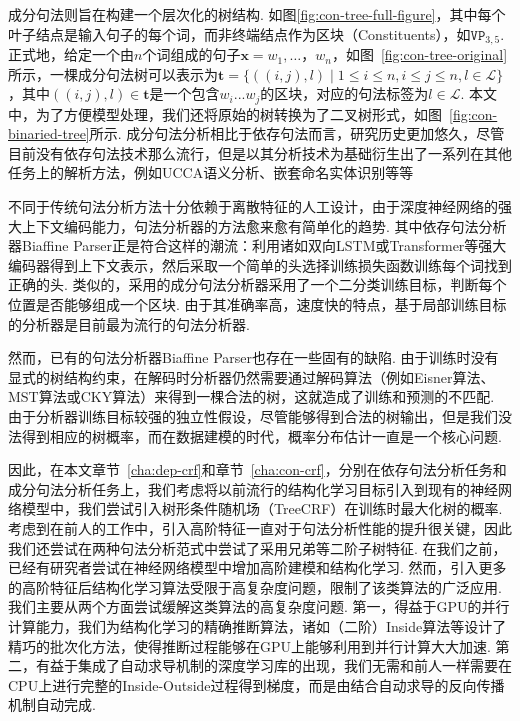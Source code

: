 
成分句法则旨在构建一个层次化的树结构.
如图\ref{fig:con-tree-full-figure}，其中每个叶子结点是输入句子的每个词，而非终端结点作为区块（Constituents），如$\texttt{VP}_{3,5}$.
正式地，给定一个由$n$个词组成的句子$\boldsymbol{x}=w_1,\dots，w_{n}$，如图~\ref{fig:con-tree-original}所示，一棵成分句法树可以表示为$\boldsymbol{t}=\{((i, j),l)\mid 1\le i \le n,i \le j \le n,l \in \mathcal{L}\}$，其中$((i,j),l) \in \boldsymbol{t}$是一个包含$w_{i}...w_{j}$的区块，对应的句法标签为$l \in \mathcal{L}$.
本文中，为了方便模型处理，我们还将原始的树转换为了二叉树形式，如图~\ref{fig:con-binaried-tree}所示.
成分句法分析相比于依存句法而言，研究历史更加悠久，尽管目前没有依存句法技术那么流行，但是以其分析技术为基础衍生出了一系列在其他任务上的解析方法，例如UCCA语义分析\citep{jiang-etal-2019-hlt}、嵌套命名实体识别\citep{fu-etal-2021-nested}等等

不同于传统句法分析方法十分依赖于离散特征的人工设计，由于深度神经网络的强大上下文编码能力，句法分析器的方法愈来愈有简单化的趋势.
其中依存句法分析器Biaffine Parser\citep{dozat-etal-2017-biaffine}正是符合这样的潮流：利用诸如双向LSTM或Transformer\citep{vaswani-2017-attention}等强大编码器得到上下文表示，然后采取一个简单的头选择训练损失函数训练每个词找到正确的头.
类似的，\citet{gaddy-etal-2018-whats}采用的成分句法分析器采用了一个二分类训练目标，判断每个位置是否能够组成一个区块.
由于其准确率高，速度快的特点，基于局部训练目标的分析器是目前最为流行的句法分析器.

然而，已有的句法分析器Biaffine Parser也存在一些固有的缺陷.
由于训练时没有显式的树结构约束，在解码时分析器仍然需要通过解码算法（例如Eisner算法、MST算法或CKY算法）来得到一棵合法的树，这就造成了训练和预测的不匹配.
由于分析器训练目标较强的独立性假设，尽管能够得到合法的树输出，但是我们没法得到相应的树概率，而在数据建模的时代，概率分布估计一直是一个核心问题\citep{le-zuidema-2014-inside}.

因此，在本文章节~\ref{cha:dep-crf}和章节~\ref{cha:con-crf}，分别在依存句法分析任务和成分句法分析任务上，我们考虑将以前流行的结构化学习目标引入到现有的神经网络模型中，我们尝试引入树形条件随机场（TreeCRF）在训练时最大化树的概率.
考虑到在前人的工作中，引入高阶特征一直对于句法分析性能的提升\citet{mcdonald-pereira-2006-online,chen-manning-2014-fast}很关键，因此我们还尝试在两种句法分析范式中尝试了采用兄弟等二阶子树特征.
在我们之前，已经有研究者尝试在神经网络模型中增加高阶建模和结构化学习\citep{zhang-etal-2019-empirical,falenska-kuhn-2019-non}.
然而，引入更多的高阶特征后结构化学习算法受限于高复杂度问题，限制了该类算法的广泛应用.
我们主要从两个方面尝试缓解这类算法的高复杂度问题.
第一，得益于GPU的并行计算能力，我们为结构化学习的精确推断算法，诸如（二阶）Inside算法等设计了精巧的批次化方法，使得推断过程能够在GPU上能够利用到并行计算大大加速.
第二，有益于集成了自动求导机制的深度学习库的出现，我们无需和前人一样需要在CPU上进行完整的Inside-Outside过程得到梯度，而是由结合自动求导的反向传播机制自动完成.

